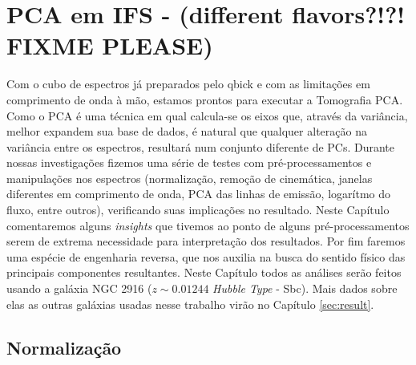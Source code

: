 



\chapter{PCA em IFS - (different flavors?!?! FIXME PLEASE)}
\label{sec:PCAemIFS}

\fixme Com o cubo de espectros já preparados pelo {\sc qbick} e com as limitações em comprimento de onda à mão, estamos
prontos para executar a Tomografia PCA. Como o PCA é uma técnica em qual calcula-se os eixos que, através da variância,
melhor expandem sua base de dados, é natural que qualquer alteração na variância entre os espectros, resultará num
conjunto diferente de PCs. Durante nossas investigações fizemos uma série de testes com pré-processamentos e
manipulações nos espectros (normalização, remoção de cinemática, janelas diferentes em comprimento de onda, PCA das
linhas de emissão, logarítmo do fluxo, entre outros), verificando suas implicações no resultado. Neste Capítulo
comentaremos alguns {\em insights} que tivemos ao ponto de alguns pré-processamentos serem de extrema necessidade para
interpretação dos resultados. Por fim faremos uma espécie de engenharia reversa, que nos auxilia na busca do sentido
físico das principais componentes resultantes. Neste Capítulo todos as análises serão feitos usando a galáxia NGC 2916
($z \sim 0.01244$ {\em Hubble Type} - Sbc). Mais dados sobre elas as outras galáxias usadas nesse trabalho virão no
Capítulo \ref{sec:result}.

\section{Normalização}
\label{sec:PCAemIFS:norm}

